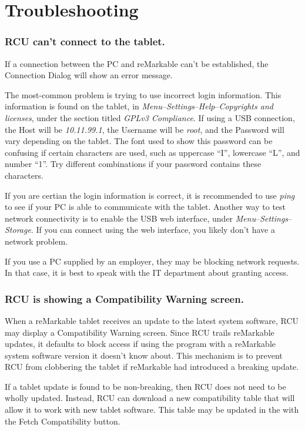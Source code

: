 \chapter{Troubleshooting}
\label{sec:troubleshooting}

\subsection{RCU can't connect to the tablet.}
If a connection between the PC and reMarkable can't be established, the Connection Dialog will show an error message.

The most-common problem is trying to use incorrect login information. This information is found on the tablet, in \textit{Menu}--\textit{Settings}--\textit{Help}--\textit{Copyrights and licenses}, under the section titled \textit{GPLv3 Compliance}. If using a USB connection, the Host will be \textit{10.11.99.1}, the Username will be \textit{root}, and the Password will vary depending on the tablet. The font used to show this password can be confusing if certain characters are used, such as uppercase ``I'', lowercase ``L'', and number ``1''. Try different combinations if your password contains these characters.

If you are certian the login information is correct, it is recommended to use \textit{ping} to see if your PC is able to communicate with the tablet. Another way to test network connectivity is to enable the USB web interface, under \textit{Menu}--\textit{Settings}--\textit{Storage}. If you can connect using the web interface, you likely don't have a network problem.

If you use a PC supplied by an employer, they may be blocking network requests. In that case, it is best to speak with the IT department about granting access.


\subsection{RCU is showing a Compatibility Warning screen.}
When a reMarkable tablet receives an update to the latest system software, RCU may display a Compatibility Warning screen. Since RCU trails reMarkable updates, it defaults to block access if using the program with a reMarkable system software version it doesn't know about. This mechanism is to prevent RCU from clobbering the tablet if reMarkable had introduced a breaking update.

If a tablet update is found to be non-breaking, then RCU does not need to be wholly updated. Instead, RCU can download a new compatibility table that will allow it to work with new tablet software. This table may be updated in the  with the Fetch Compatibility button.

